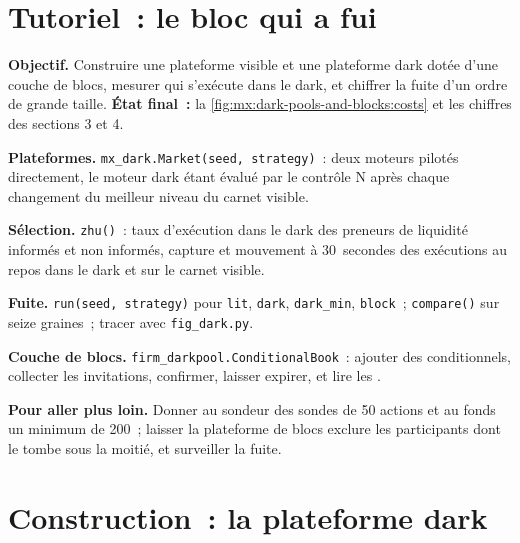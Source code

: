 \section{Tutoriel~: le bloc qui a fui}\label{tut:mx:dark-pools-and-blocks:tut}

\begin{tutorial}
\textbf{Objectif.} Construire une plateforme visible et une plateforme dark dotée d'une couche de blocs, mesurer qui s'exécute dans le dark, et chiffrer la fuite d'un ordre de grande taille.
\textbf{État final~:} la \cref{fig:mx:dark-pools-and-blocks:costs} et les chiffres des sections 3 et 4.
\begin{tutsteps}
\item \textbf{Plateformes.} \texttt{mx\_dark.Market(seed, strategy)}~: deux moteurs pilotés directement, le moteur dark étant évalué par le contrôle N après chaque changement du
meilleur niveau du carnet visible.
\item \textbf{Sélection.} \texttt{zhu()}~: taux d'exécution dans le dark des preneurs de liquidité informés et non informés, capture et mouvement à 30~secondes des exécutions au repos dans le dark et sur
le carnet visible.
\item \textbf{Fuite.} \texttt{run(seed, strategy)} pour \texttt{lit}, \texttt{dark}, \texttt{dark\_min}, \texttt{block}~; \texttt{compare()} sur
seize graines~; tracer avec \texttt{fig\_dark.py}.
\item \textbf{Couche de blocs.} \texttt{firm\_darkpool.ConditionalBook}~: ajouter des conditionnels, collecter les invitations, confirmer, laisser expirer, et lire les .
\end{tutsteps}
\textbf{Pour aller plus loin.} Donner au sondeur des sondes de 50 actions et au fonds un minimum de 200~; laisser la plateforme de blocs exclure les participants dont le 
tombe sous la moitié, et surveiller la fuite.
\end{tutorial}

\section{Construction~: la plateforme dark}\label{bld:mx:dark-pools-and-blocks:darkpool}

